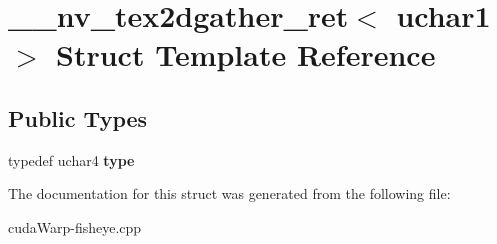 \hypertarget{struct____nv__tex2dgather__ret_3_01uchar1_01_4}{}\section{\+\_\+\+\_\+nv\+\_\+tex2dgather\+\_\+ret$<$ uchar1 $>$ Struct Template Reference}
\label{struct____nv__tex2dgather__ret_3_01uchar1_01_4}
\subsection*{Public Types}
\begin{DoxyCompactItemize}
\item 
typedef uchar4 {\bfseries type}\hypertarget{struct____nv__tex2dgather__ret_3_01uchar1_01_4_ac56a9361b01486e2238d8027a319443e}{}\label{struct____nv__tex2dgather__ret_3_01uchar1_01_4_ac56a9361b01486e2238d8027a319443e}

\end{DoxyCompactItemize}


The documentation for this struct was generated from the following file\+:\begin{DoxyCompactItemize}
\item 
cuda\+Warp-\/fisheye.\+cpp\end{DoxyCompactItemize}
